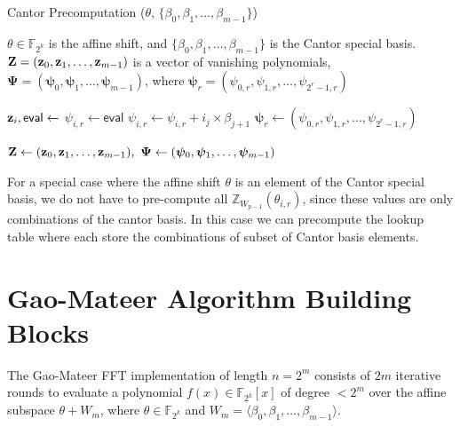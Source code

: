 \begin{algorithm}[h]
	\caption{Cantor Precomputation ($\theta$, $\{\beta_0, \beta_1, \ldots, \beta_{m-1}\}$)}
	\label{Algo:Cantor_Precomp}
	\begin{algorithmic}[1]
		\Require $\theta \in \mathbb{F}_{2^k}$ is the affine shift, and $\{\beta_0, \beta_1, \ldots, \beta_{m-1}\}$ is the Cantor special basis.
		\Ensure $\mathbf{Z} = ({\bf{z}}_0, {\bf{z}}_1, \ldots, {\bf{z}}_{m-1})$ is a vector of vanishing polynomials,  
		$\boldsymbol{\Psi} = (\boldsymbol{\psi}_0, \boldsymbol{\psi}_1, \ldots, \boldsymbol{\psi}_{m-1})$,  
		where $\boldsymbol{\psi}_r = ( \psi_{0,r}, \psi_{1,r}, \ldots, \psi_{2^r-1,r} )$
		
		\State ${\bf{z}}_i, \mathsf{eval} \gets$ 
		\State $\psi_{i,r} \gets \mathsf{eval}$
		\State $\psi_{i,r} \gets \psi_{i,r} + i_j \times \beta_{j+1}$
		\EndFor
		\EndFor
		\State $\boldsymbol{\psi}_r \gets ( \psi_{0,r}, \psi_{1,r}, \ldots, \psi_{2^r - 1,r} )$
		\EndFor
		
		\State \Return $\mathbf{Z} \gets ({\bf{z}}_0, {\bf{z}}_1, \ldots, {\bf{z}}_{m-1}),\ \boldsymbol{\Psi} \gets (\boldsymbol{\psi}_0, \boldsymbol{\psi}_1, \ldots, \boldsymbol{\psi}_{m-1})$
	\end{algorithmic}
\end{algorithm}



For a special case where the affine shift $\theta$ is an element of the Cantor special basis, we do not have to pre-compute all $\mathbb{Z}_{W_{p-1}}(\theta_{i, r})$, since these values are only combinations of the cantor basis. In this case we can precompute the lookup table where each store the combinations of subset of Cantor basis elements. 


\section{Gao-Mateer Algorithm Building Blocks}\label{Sec:Gao-implementation}

The Gao-Mateer FFT implementation of length $n = 2^m$ consists of $2m$ iterative rounds to evaluate a polynomial $f(x) \in \mathbb{F}_{2^k}[x]$ of degree $< 2^m$ over the affine subspace $\theta + W_m$, where $\theta \in \mathbb{F}_{2^k}$ and $W_m = \langle \beta_0, \beta_1, \ldots, \beta_{m-1} \rangle$. %

